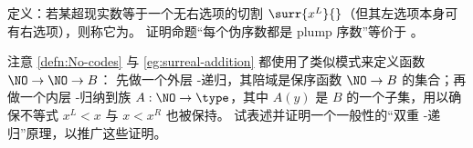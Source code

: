 \begin{ex}\label{ex:pseudo-ordinals}
  定义：若某超现实数等于一个无右选项的切割 $\surr{x^L}{}$（但其左选项本身可有右选项），则称它为。
  证明命题“每个伪序数都是 plump 序数”等价于 \LEM{}。
\end{ex}

\begin{ex}\label{ex:double-No-recursion}
  注意 \cref{defn:No-codes} 与 \cref{eg:surreal-addition} 都使用了类似模式来定义函数 $\NO \to \NO \to B$：
  先做一个外层 \NO-递归，其陪域是保序函数 $\NO\to B$ 的集合；再做一个内层 \NO-归纳到族 $A:\NO\to\type$，其中 $A(y)$ 是 $B$ 的一个子集，用以确保不等式 $x^L<x$ 与 $x<x^R$ 也被保持。
  试表述并证明一个一般性的“双重 \NO-递归”原理，以推广这些证明。
\end{ex}

%

